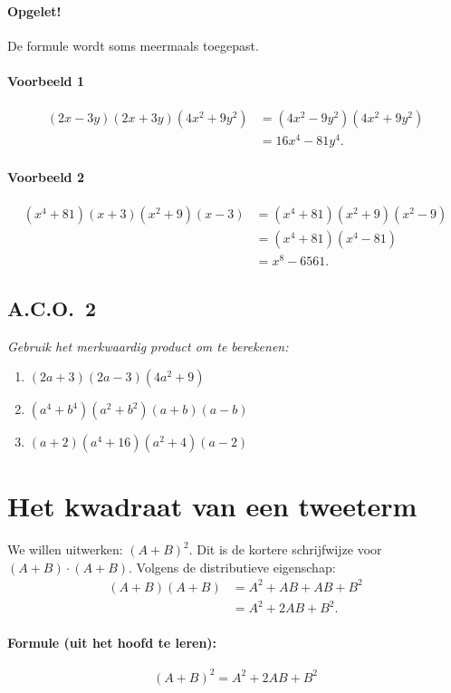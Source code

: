 \documentclass[a4paper,12pt]{article}
\begin{document}
\paragraph*{Opgelet!} De formule wordt soms meermaals toegepast.

\paragraph*{Voorbeeld 1}
\[
\begin{aligned}
(2x-3y)(2x+3y)(4x^2+9y^2)
  &=(4x^2-9y^2)(4x^2+9y^2)\\
  &=16x^4-81y^4.
\end{aligned}
\]

\paragraph*{Voorbeeld 2}
\[
\begin{aligned}
(x^4+81)(x+3)(x^2+9)(x-3)
  &=(x^4+81)(x^2+9)(x^2-9)\\
  &=(x^4+81)(x^4-81)\\
  &=x^8-6561.
\end{aligned}
\]

\subsection*{A.C.O.\ 2}
\emph{Gebruik het merkwaardig product om te berekenen:}
\begin{enumerate}
  \item \((2a+3)(2a-3)(4a^2+9)\)
  \item \((a^4+b^4)(a^2+b^2)(a+b)(a-b)\)
  \item \((a+2)(a^4+16)(a^2+4)(a-2)\)
\end{enumerate}

\section{Het kwadraat van een tweeterm}
We willen uitwerken: \((A+B)^2\). Dit is de kortere schrijfwijze voor \((A+B)\cdot(A+B)\). Volgens de distributieve eigenschap:
\begin{align*}
  (A+B)(A+B) & =A^2+AB+AB+B^2 \\
             & =A^2+2AB+B^2.
\end{align*}

\paragraph*{Formule (uit het hoofd te leren):}
\[
\boxed{(A+B)^2=A^2+2AB+B^2}
\]
\end{document}
